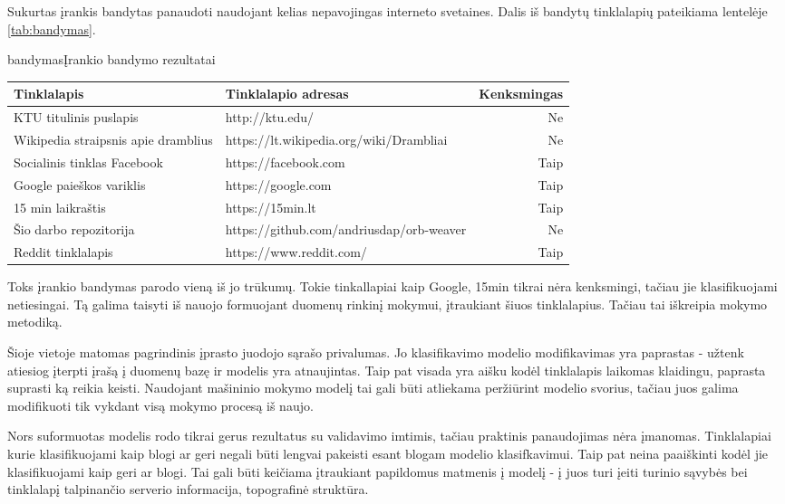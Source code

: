 
Sukurtas įrankis bandytas panaudoti naudojant kelias nepavojingas interneto svetaines. Dalis iš bandytų tinklalapių pateikiama lentelėje \vref{tab:bandymas}.

\begin{ktutable}{bandymas}{Įrankio bandymo rezultatai}
    \begin{tabular}{|p{5 cm}|p{5 cm}|r|}
    \hline
    Tinklalapis & Tinklalapio adresas & Kenksmingas \\ \hline
    KTU titulinis puslapis & http://ktu.edu/ & Ne \\ \hline
    Wikipedia straipsnis apie dramblius & https://lt.wikipedia.org/wiki/Drambliai & Ne \\ \hline
    Socialinis tinklas Facebook & https://facebook.com & Taip \\ \hline
    Google paieškos variklis & https://google.com & Taip \\ \hline
    15 min laikraštis & https://15min.lt & Taip \\ \hline
    Šio darbo repozitorija & https://github.com/andriusdap/orb-weaver & Ne \\ \hline
    Reddit tinklalapis & https://www.reddit.com/ & Taip \\ \hline
    \end{tabular}
\end{ktutable}

Toks įrankio bandymas parodo vieną iš jo trūkumų. Tokie tinkallapiai kaip Google, 15min tikrai nėra kenksmingi, tačiau jie klasifikuojami netiesingai. Tą galima taisyti iš nauojo formuojant duomenų rinkinį mokymui, įtraukiant šiuos tinklalapius. Tačiau tai iškreipia mokymo metodiką.

Šioje vietoje matomas pagrindinis įprasto juodojo sąrašo privalumas. Jo klasifikavimo modelio modifikavimas yra paprastas - užtenk atiesiog įterpti įrašą į duomenų bazę ir modelis yra atnaujintas. Taip pat visada yra aišku kodėl tinklalapis laikomas klaidingu, paprasta suprasti ką reikia keisti. Naudojant mašininio mokymo modelį tai gali būti atliekama peržiūrint modelio svorius, tačiau juos galima modifikuoti tik vykdant visą mokymo procesą iš naujo.

Nors suformuotas modelis rodo tikrai gerus rezultatus su validavimo imtimis, tačiau praktinis panaudojimas nėra įmanomas. Tinklalapiai kurie klasifikuojami kaip blogi ar geri negali būti lengvai pakeisti esant blogam modelio klasifkavimui. Taip pat neina paaiškinti kodėl jie klasifikuojami kaip geri ar blogi. Tai gali būti keičiama įtraukiant papildomus matmenis į modelį - į juos turi įeiti turinio sąvybės bei tinklalapį talpinančio serverio informacija, topografinė struktūra.